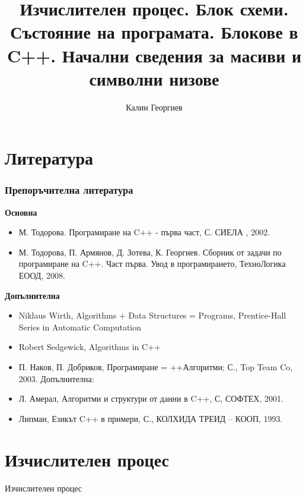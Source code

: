 \documentclass{beamer}
\begin{document}
\title[Увод в програмирането]{Изчислителен процес. Блок схеми. Състояние на програмата. Блокове в C++. Начални сведения за масиви и символни низове} 
\author{Калин Георгиев} 
\frame{\titlepage} 


\section{Литература} 



\begin{frame}[fragile]
\frametitle{Препоръчителна литература}


\textbf{Основна}

\begin{itemize}

\item М. Тодорова. Програмиране на C++ - първа част, С. СИЕЛА , 2002.
\item М. Тодорова, П. Армянов, Д. Зотева, К. Георгиев. Сборник от задачи по програмиране на C++. Част първа. Увод в програмирането, ТехноЛогика ЕООД, 2008.

\end{itemize}


\textbf{Допълнителна}


\begin{itemize}

\item  Niklaus Wirth,  Algorithms + Data Structures = Programs, Prentice-Hall Series in Automatic Computation 
\item Robert Sedgewick, Algorithms in C++
\item П. Наков, П. Добриков, Програмиране = ++Алгоритми; С., Top Team Co, 2003.
Допълнителна:
\item Л. Амерал, Алгоритми и структури от данни в C++, С, СОФТЕХ, 2001.
\item Липман, Езикът C++ в примери, С., КОЛХИДА ТРЕИД – КООП, 1993.

\end{itemize}


\end{frame}



\section{Изчислителен процес} 


\begin{frame}
\centerline{Изчислителен процес}
\end{frame}
\end{document}
